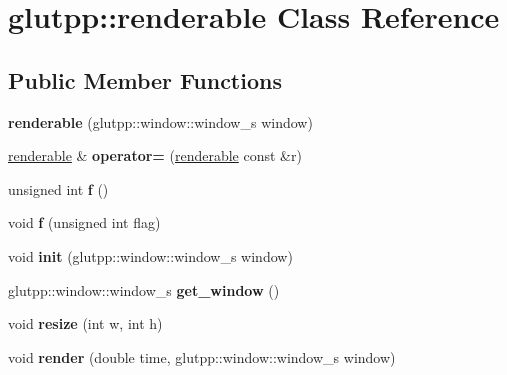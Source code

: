 \hypertarget{classglutpp_1_1renderable}{\section{glutpp\-:\-:renderable \-Class \-Reference}
\label{classglutpp_1_1renderable}
}
\subsection*{\-Public \-Member \-Functions}
\begin{DoxyCompactItemize}
\item 
\hypertarget{classglutpp_1_1renderable_a110ba775c50416d8d018046dfb523ff5}{{\bfseries renderable} (glutpp\-::window\-::window\-\_\-s window)}\label{classglutpp_1_1renderable_a110ba775c50416d8d018046dfb523ff5}

\item 
\hypertarget{classglutpp_1_1renderable_a7c18c1b5d009a3fb73f86e335ffcc556}{\hyperlink{classglutpp_1_1renderable}{renderable} \& {\bfseries operator=} (\hyperlink{classglutpp_1_1renderable}{renderable} const \&r)}\label{classglutpp_1_1renderable_a7c18c1b5d009a3fb73f86e335ffcc556}

\item 
\hypertarget{classglutpp_1_1renderable_aac705af4136c474069d851a9520f5720}{unsigned int {\bfseries f} ()}\label{classglutpp_1_1renderable_aac705af4136c474069d851a9520f5720}

\item 
\hypertarget{classglutpp_1_1renderable_a971cd016cc408f732f5d0460744e2a48}{void {\bfseries f} (unsigned int flag)}\label{classglutpp_1_1renderable_a971cd016cc408f732f5d0460744e2a48}

\item 
\hypertarget{classglutpp_1_1renderable_a7a7d55f4efcd6214ad4b83d03807d8e7}{void {\bfseries init} (glutpp\-::window\-::window\-\_\-s window)}\label{classglutpp_1_1renderable_a7a7d55f4efcd6214ad4b83d03807d8e7}

\item 
\hypertarget{classglutpp_1_1renderable_aa1d67539130aaee624f28d3b95ff98f8}{glutpp\-::window\-::window\-\_\-s {\bfseries get\-\_\-window} ()}\label{classglutpp_1_1renderable_aa1d67539130aaee624f28d3b95ff98f8}

\item 
\hypertarget{classglutpp_1_1renderable_abd73b2bba233d1ff95fe46496888a5cf}{void {\bfseries resize} (int w, int h)}\label{classglutpp_1_1renderable_abd73b2bba233d1ff95fe46496888a5cf}

\item 
\hypertarget{classglutpp_1_1renderable_a4a801adc4038a97e52224e5b71df145d}{void {\bfseries render} (double time, glutpp\-::window\-::window\-\_\-s window)}\label{classglutpp_1_1renderable_a4a801adc4038a97e52224e5b71df145d}

\end{DoxyCompactItemize}
